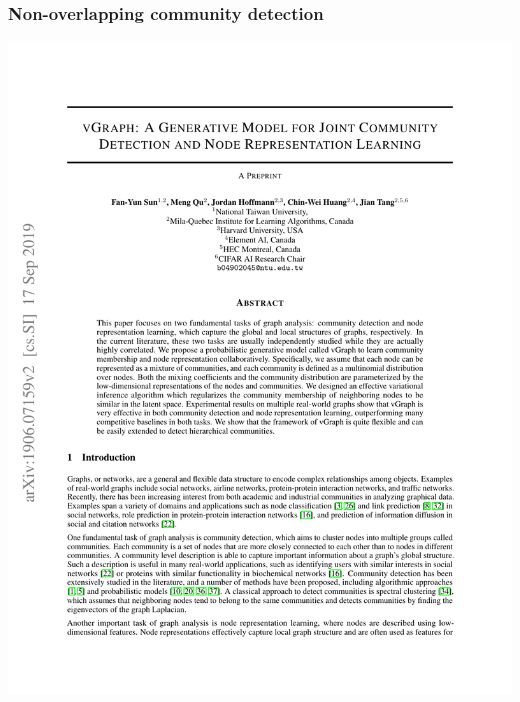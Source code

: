 \documentclass[12pt,aspectratio=169]{beamer}
\begin{document}
    \begin{frame}
        \frametitle{Non-overlapping community detection}

        \centering
        \includegraphics[page=7,trim=2.5cm 22cm 2.5cm 2cm,clip,scale=.8]{vGraph.pdf}
    \end{frame}
\end{document}
